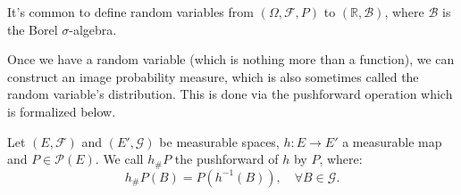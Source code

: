 It's common to define random variables from $(\Omega, \mathcal F, P)$ to
$(\mathbb R, \mathcal B)$, where $\mathcal B$ is the Borel $\sigma$-algebra.

Once we have a random variable (which is nothing more than a function),
we can construct an image probability measure, which is also
sometimes called the random variable's distribution. This is done
via the pushforward operation which is formalized below.

\begin{definition}[Pushforward]
	Let $(E,\mathcal F)$ and $(E', \mathcal G)$ be measurable spaces, $h : E \to E'$ a measurable map
	and $P \in \mathcal P(E)$. We call $h_\# P$ the
	pushforward of $h$ by $P$, where:
	\begin{equation}
		h_\#P(B) = P(h^{-1}(B)),\quad \forall B \in \mathcal G.
	\end{equation}
\end{definition}

